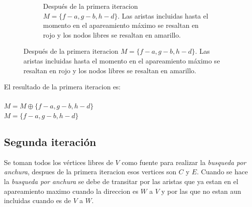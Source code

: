 \documentclass[12pt,a4paper]{article}
\begin{document}
\begin{center}
\begin{figure}[!htb]
\begin{minipage}{.45\linewidth}
\begin{subfigure}[t]{.9\linewidth}
                \captionsetup{justification=centering}
			\captionsetup{belowskip=0pt}
    		\caption{\footnotesize Después de la primera iteracion $M=\{f-a,g-b,h-d\}$. Las aristas incluidas hasta el momento en el apareamiento máximo se resaltan en rojo y los nodos libres se resaltan en amarillo.}
                \label{fig:weather_activity}
            \end{subfigure}
        \end{minipage}
\end{figure}
\end{center}

\noindent El resultado de la primera iteracion es:\\\\
$M = M \oplus \{f-a,g-b,h-d\}$\\
$M = \{f-a,g-b,h-d\}$

\subsection{Segunda iteración} \noindent
Se toman todos los vértices libres de $V$ como fuente para realizar la \textit{busqueda por anchura}, despues de la primera iteracion esos vertices son $C$ y $E$. Cuando se hace la \textit{busqueda por anchura} se debe de transitar por las aristas que ya estan en el apareamiento maximo cuando la direccion es $W$ a $V$ y por las que no estan aun incluidas cuando es de $V$ a $W$. 
\end{document}
